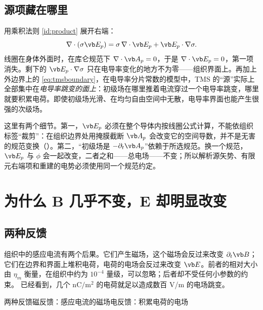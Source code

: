 \subsection{源项藏在哪里}
用乘积法则 \eqref{id:product} 展开右端：
\begin{equation}
\nabla\cdot(\sigma\vb E_p)=\sigma\,\nabla\cdot\vb E_p+\vb E_p\cdot\nabla\sigma .
\end{equation}
线圈在身体外面时，在库仑规范下 $\nabla\cdot\vb A_p=0$，于是 $\nabla\cdot\vb E_p=0$，第一项消失。剩下的 $\vb E_p\cdot\nabla\sigma$ 只在电导率变化的地方不为零——组织界面上。再加上外边界上的 \eqref{eq:tmsboundary}，在电导率分片常数的模型中，TMS 的“源”实际上全部集中在\emph{电导率跳变的面上}：初级场在哪里推着电流穿过一个电导率跳变，哪里就要积累电荷。即使初级场光滑、在均匀自由空间中无散，电导率界面也能产生很强的次级场。

这里有两个细节。第一，$\vb E_p$ 必须在整个导体内按线圈公式计算，不能依组织标签“裁剪”：在组织边界处用掩膜截断 $\vb A_p$ 会改变它的空间导数，并不是无害的规范变换（）。第二，“初级场是 $-\partial_t\vb A_p$”依赖于所选规范。换一个规范，$\vb E_p$ 与 $\phi$ 会一起改变，二者之和——总电场——不变；所以解析源矢势、有限元右端项和重建的电势必须使用同一个规范约定。

\section{为什么 B 几乎不变，E 却明显改变}\label{sec:tms-charges}

\subsection{两种反馈}
组织中的感应电流有两个后果。它们产生磁场，这个磁场会反过来改变 $\partial_t\vb B$；它们在边界和界面上堆积电荷，电荷的电场会反过来改变 $\vb E$。前者的相对大小由 $\eta_m$ 衡量，在组织中约为 $10^{-4}$ 量级，可以忽略；后者却不受任何小参数的约束。 已经看到，几个 $\mathrm{nC/m^2}$ 的电荷就足以造成数百 V/m 的电场跳变。

\begin{compare}{两种反馈}{磁反馈：感应电流的磁场}{电反馈：积累电荷的电场}
\end{compare}

